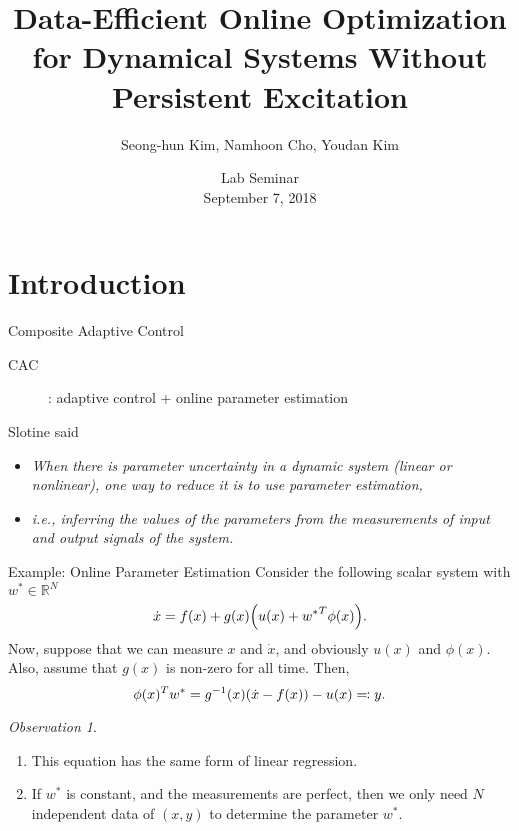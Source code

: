 \documentclass[handout]{beamer}
\title{Data-Efficient Online Optimization for Dynamical Systems Without
Persistent Excitation}
\author{Seong-hun Kim, Namhoon Cho, Youdan Kim}
\institute{
	Flight Dynamics and Control Lab. \\
	Seoul Natl.~Univ. \\
}
\date{Lab Seminar \\ September 7, 2018}
\theoremstyle{plain}
\theoremstyle{definition}
\theoremstyle{remark}
\newtheorem{observation}{Observation}
\newcommand{\MB}[1]{\mathbb{#1}}
\begin{document}
\begin{frame}
	\maketitle
\end{frame}


\section{Introduction}

\begin{frame}{Composite Adaptive Control}
	\begin{description}
		\item[CAC]: adaptive control + online parameter estimation
	\end{description}

	\vspace{1em}
	Slotine said~
	\begin{itemize}
		\item {\it When there is parameter uncertainty in a dynamic system (linear or
			nonlinear), one way to reduce it is to use parameter estimation,}
		\item {\it i.e., inferring the values of the parameters from the
			measurements of input and output signals of the system.}
	\end{itemize}
\end{frame}

\begin{frame}{Example: Online Parameter Estimation}
	Consider the following scalar system with $w^\ast \in \MB{R}^N$
	\begin{equation*}
		\dot{x} = f(x) + g(x) \qty(u(x) + {w^\ast}^T \phi(x)).
	\end{equation*}
	\pause
	Now, suppose that we can measure $x$ and $\dot{x}$, and obviously $u(x)$ and
	$\phi(x)$. Also, assume that $g(x)$ is non-zero for all time. Then,
	\begin{equation*}
		\phi(x)^T w^\ast = g^{-1}(x) \qty(\dot{x} - f(x)) - u(x) \eqqcolon y.
	\end{equation*}
	\pause
	\begin{observation}
		\begin{enumerate}
			\item This equation has the same form of linear regression.
			\item If $w^\ast$ is constant, and the measurements are perfect, then we
				only need $N$ independent data of $(x, y)$ to determine the parameter
				$w^\ast$.
		\end{enumerate}
	\end{observation}
\end{frame}
\end{document}
